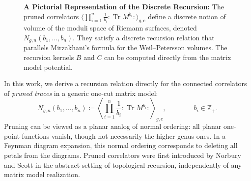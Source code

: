 \documentclass[a4paper,11pt,english]{article}
\theoremstyle{plain}
\theoremstyle{definition}
\theoremstyle{plain}
\newcommand{\cc}{\mathrm{c}}
\DeclareMathOperator{\Tr}{Tr}
\newcommand{\normord}[1]{:\mathrel{#1}:}
\newcommand{\NTr}[1]{\normord{\Tr{#1}}}
\newcommand{\Z}{\mathbb{Z}}
\begin{document}
\begin{figure}[b]
\caption{
    \textbf{A Pictorial Representation of the Discrete Recursion:} 
    The pruned correlators 
    $\langle \prod_{i=1}^n \frac{1}{b_i} \! \NTr{M^{b_i}} \rangle_{g,\cc}$ 
    define a discrete notion of volume of the moduli space of Riemann surfaces, denoted 
    $N_{g,n}(b_1,\ldots,b_n)$. 
    They satisfy a discrete recursion relation that parallels Mirzakhani's formula for the Weil--Petersson volumes. 
    The recursion kernels $B$ and $C$ can be computed directly from the matrix model potential.
}
\label{fig:disc:rec}
\end{figure}

In this work, we derive a recursion relation directly for the connected correlators of \emph{pruned traces} in a generic one-cut matrix model:
\begin{equation}
    N_{g,n}(b_1,\ldots,b_n)
    \coloneqq
    \left\langle \prod_{i=1}^n \frac{1}{b_i} \NTr{M^{b_i}} \right\rangle_{\!\!g,\cc},
    \qquad\qquad
    b_i \in \Z_+ .
\end{equation}
Pruning can be viewed as a planar analog of normal ordering: all planar one-point functions vanish, though not necessarily the higher-genus ones. In a Feynman diagram expansion, this normal ordering corresponds to deleting all petals from the diagrams. Pruned correlators were first introduced by Norbury and Scott \cite{NS13} in the abstract setting of topological recursion, independently of any matrix model realization.
\end{document}
